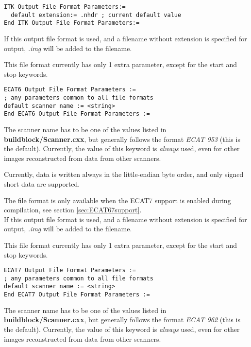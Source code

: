 \documentclass{article}
\begin{document}
\begin{verbatim}
ITK Output File Format Parameters:=
  default extension:= .nhdr ; current default value
End ITK Output File Format Parameters:=
\end{verbatim}

{ 
}

If this output file format is used, and a filename without extension 
is specified for output, \textit{.img} will be added to the filename.

{ 
}

This file format currently has only 1 extra parameter, except 
for the start and stop keywords.

\begin{verbatim}
ECAT6 Output File Format Parameters :=
; any parameters common to all file formats
default scanner name := <string>
End ECAT6 Output File Format Parameters :=
\end{verbatim}

The scanner name has to be one of the values listed in \textbf{buildblock/Scanner.cxx}, 
but generally follows the format \textit{ECAT 953} (this is the default). 
Currently, the value of this keyword is \textit{always} used, even 
for other images reconstructed from data from other scanners.

Currently, data is written always in the little-endian byte order, 
and only signed short data are supported.

{ 
}

The file format is only available when the ECAT7 support is enabled 
during compilation, see section \ref{sec:ECAT67support}.\\
If this output file format is used, and a filename without extension 
is specified for output, \textit{.img} will be added to the filename.

{ 
}

This file format currently has only 1 extra parameter, except 
for the start and stop keywords.

\begin{verbatim}
ECAT7 Output File Format Parameters :=
; any parameters common to all file formats
default scanner name := <string>
End ECAT7 Output File Format Parameters :=
\end{verbatim}

The scanner name has to be one of the values listed in \textbf{buildblock/Scanner.cxx}, 
but generally follows the format \textit{ECAT 962} (this is the default). 
Currently, the value of this keyword is \textit{always} used, even 
for other images reconstructed from data from other scanners.
\end{document}
